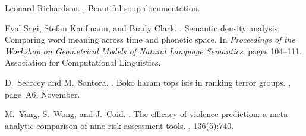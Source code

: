 \documentclass[11pt]{article}
\begin{document}
\begin{thebibliography}{}
Leonard Richardson.
.
\newblock Beautiful soup documentation.

Eyal Sagi, Stefan Kaufmann, and Brady Clark.
.
\newblock Semantic density analysis: Comparing word meaning across time and
  phonetic space.
\newblock In {\em Proceedings of the Workshop on Geometrical Models of Natural
  Language Semantics}, pages 104--111. Association for Computational
  Linguistics.

D.~Searcey and M.~Santora.
.
\newblock Boko haram tops isis in ranking terror groups.
, page~A6, November.

M.~Yang, S.~Wong, and J.~Coid.
.
\newblock The efficacy of violence prediction: a meta-analytic comparison of
  nine risk assessment tools.
, 136(5):740.

\end{thebibliography}
\end{document}
